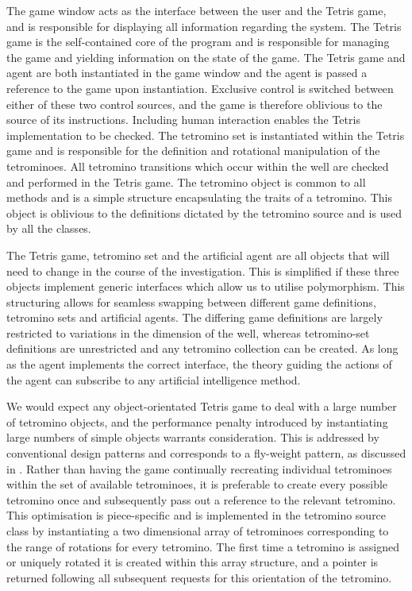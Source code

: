 \documentclass{rucsthesis}
\begin{document}
The game window acts as the interface between the user and the Tetris game, and is responsible for displaying all information regarding the system. The Tetris game is the self-contained core of the program and is responsible for managing the game and yielding information on the state of the game. The Tetris game and agent are both instantiated in the game window and the agent is passed a reference to the game upon instantiation. Exclusive control is switched between either of these two control sources, and the game is therefore oblivious to the source of its instructions.  Including human interaction enables the Tetris implementation to be checked. The tetromino set is instantiated within the Tetris game and is responsible for the definition and rotational manipulation of the tetrominoes. All tetromino transitions which occur within the well are checked and performed in the Tetris game. The tetromino object is common to all methods and is a simple structure encapsulating the traits of a tetromino. This object is oblivious to the definitions dictated by the tetromino source and is used by all the classes.

The Tetris game, tetromino set and the artificial agent are all objects that will need to change in the course of the investigation. This is simplified if these three objects implement generic interfaces which allow us to utilise polymorphism. This structuring allows for seamless swapping between different game definitions, tetromino sets and artificial agents. The differing game definitions are largely restricted to variations in the dimension of the well, whereas tetromino-set definitions are unrestricted and any tetromino collection can be created. As long as the agent implements the correct interface, the theory guiding the actions of the agent can subscribe to any artificial intelligence method.

We would expect any object-orientated Tetris game to deal with a large number of tetromino objects, and the performance penalty introduced by instantiating large numbers of simple objects warrants consideration. This is addressed by conventional design patterns and corresponds to a fly-weight pattern, as discussed in \cite{designp}. Rather than having the game continually recreating individual tetrominoes within the set of available tetrominoes, it is preferable to create every possible tetromino once and subsequently pass out a reference to the relevant tetromino. This optimisation is piece-specific and is implemented in the tetromino source class by instantiating a two dimensional array of tetrominoes corresponding to the range of rotations for every tetromino. The first time a tetromino is assigned or uniquely rotated it is created within this array structure, and a pointer is returned following all subsequent requests for this orientation of the tetromino.
\end{document}

